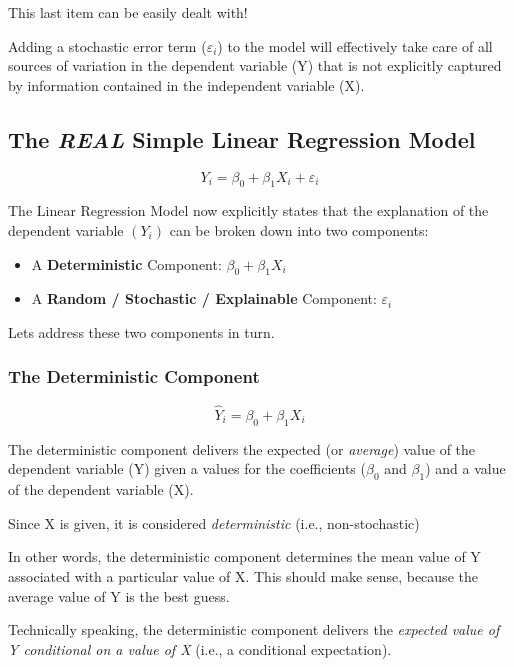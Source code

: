 \documentclass[
]{book}
\begin{document}
This last item can be easily dealt with!

Adding a stochastic error term (\(\varepsilon_i\)) to the model will effectively take care of all sources of variation in the dependent variable (Y) that is not explicitly captured by information contained in the independent variable (X).

\hypertarget{the-real-simple-linear-regression-model}{%
\subsection{\texorpdfstring{The \emph{REAL} Simple Linear Regression Model}{The REAL Simple Linear Regression Model}}\label{the-real-simple-linear-regression-model}}

\[Y_i=\beta_0+\beta_1X_i+\varepsilon_i\]

The Linear Regression Model now explicitly states that the explanation of the dependent variable \((Y_i)\) can be broken down into two components:

\begin{itemize}
\item
  A \textbf{Deterministic} Component: \(\beta_0+\beta_1X_i\)
\item
  A \textbf{Random / Stochastic / Explainable} Component: \(\varepsilon_i\)
\end{itemize}

Lets address these two components in turn.

\hypertarget{the-deterministic-component}{%
\subsubsection*{The Deterministic Component}\label{the-deterministic-component}}

\[\hat{Y}_i=\beta_0+\beta_1X_i\]

The deterministic component delivers the expected (or \emph{average}) value of the dependent variable (Y) given a values for the coefficients (\(\beta_0\) and \(\beta_1\)) and a value of the dependent variable (X).

Since X is given, it is considered \emph{deterministic} (i.e., non-stochastic)

In other words, the deterministic component determines the mean value of Y associated with a particular value of X. This should make sense, because the average value of Y is the best guess.

Technically speaking, the deterministic component delivers the \emph{expected value of Y conditional on a value of X} (i.e., a conditional expectation).
\end{document}

